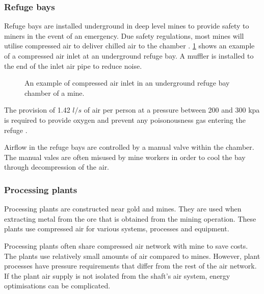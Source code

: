 \subsubsection{Refuge bays}
Refuge bays are installed underground in deep level mines to provide safety to miners in the event of an emergency. Due safety regulations, most mines will utilise compressed air to deliver chilled air to the chamber \cite{brake1999criteria}. \cref{fig: Refuge Bay} shows an example of a compressed air inlet at an underground refuge bay. A muffler is installed to the end of the inlet air pipe to reduce noise.
\begin{figure}[h]
	\centering
	\caption{An example of compressed air inlet in an underground refuge bay chamber of a mine.}
	\label{fig: Refuge Bay}
\end{figure}
\par The provision of 1.42 $l/s$ of air per person at a pressure between 200 and 300 \gls{kpa} is required to provide oxygen and prevent any poisonousness gas entering the refuge \cite{brake1999criteria}.\par
Airflow in the refuge bays are controlled by a manual valve within the chamber. The manual vales are often misused by mine workers in order to cool the bay through decompression of the air. %
\subsubsection{Processing plants}
Processing plants are constructed near gold and mines. They are used when extracting metal from the ore that is obtained from the mining operation. These plants use compressed air for various systems, processes and equipment. 
\par 
Processing plants often share compressed air network with mine to save costs\cite{Marais2012PhD}. The plants use relatively small amounts of air compared to mines. However, plant processes have pressure requirements that differ from the rest of the air network. If the plant air supply is not isolated from the shaft's air system, energy optimisations can be complicated. 
